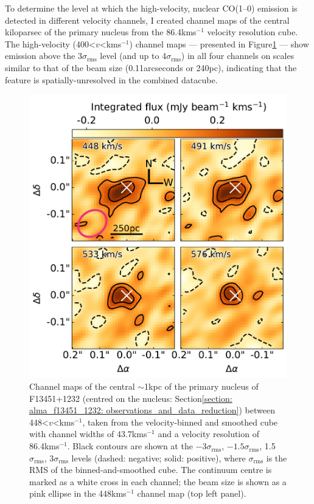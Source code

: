 To determine the level at which the high-velocity, nuclear \mbox{CO(1--0)} emission is detected in different velocity channels, I created channel maps of the central kiloparsec of the primary nucleus from the 86.4\;km\;s$^{-1}$ velocity resolution cube. The high-velocity (400\;\textless\;$v$\;\textless{}\;km\;s$^{-1}$) channel maps --- presented in Figure\;\ref{fig: alma_f13451_1232: channel_maps} --- show emission above the 3$\sigma_\mathrm{rms}$ level (and up to 4$\sigma_\mathrm{rms}$) in all four channels on scales similar to that of the beam size (0.11\;arcseconds or 240\;pc), indicating that the feature is spatially-unresolved in the combined datacube. 

\begin{figure}[!b]
    \centering
    \includegraphics[width=0.66\linewidth]{figures/alma_f13451_1232/channel_maps.pdf}
    \caption[Velocity channel maps of the central $\sim$1\;kpc of the primary nucleus of F13451+1232.]{Channel maps of the central $\sim$1\;kpc of the primary nucleus of F13451+1232 (centred on the nucleus: Section\;\ref{section: alma_f13451_1232: observations_and_data_reduction}) between 448\;\textless\;$v$\;\textless{}\;km\;s$^{-1}$, taken from the velocity-binned and smoothed cube with channel widths of 43.7\;km\;s$^{-1}$ and a velocity resolution of 86.4\;km\;s$^{-1}$. Black contours are shown at the $-3\sigma_\mathrm{rms}$, $-1.5\sigma_\mathrm{rms}$, 1.5$\sigma_\mathrm{rms}$, 3$\sigma_\mathrm{rms}$ levels (dashed: negative; solid: positive), where $\sigma_\mathrm{rms}$ is the RMS of the binned-and-smoothed cube. The continuum centre is marked as a white cross in each channel; the beam size is shown as a pink ellipse in the 448\;km\;s$^{-1}$ channel map (top left panel).}
    \label{fig: alma_f13451_1232: channel_maps}
\end{figure}

